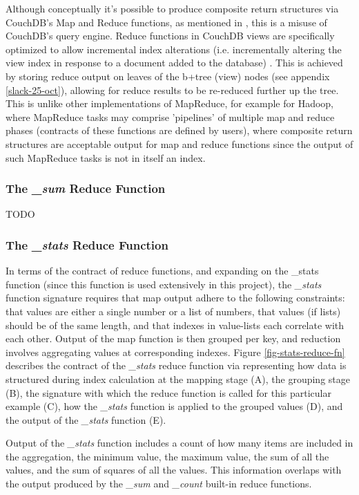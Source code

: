 Although conceptually it's possible to produce composite return structures via CouchDB's Map and Reduce functions, as mentioned in \cite{reduceFunctions}, this is a misuse of CouchDB's query engine. Reduce functions in CouchDB views are specifically optimized to allow incremental index alterations (i.e. incrementally altering the view index in response to a document added to the database) \cite{reduceFunctions}. This is achieved by storing reduce output on leaves of the b+tree (view) nodes (see appendix \ref{slack-25-oct}), allowing for reduce results to be re-reduced further up the tree. This is unlike other implementations of MapReduce, for example for Hadoop, where MapReduce tasks may comprise 'pipelines' of multiple map and reduce phases (contracts of these functions are defined by users), where composite return structures are acceptable output for map and reduce functions since the output of such MapReduce tasks is not in itself an index.

\subsubsection{The \textit{\_sum} Reduce Function}
TODO

\subsubsection{The \textit{\_stats} Reduce Function}
In terms of the contract of reduce functions, and expanding on the \_stats function (since this function is used extensively in this project), the \textit{\_stats} function signature requires that map output adhere to the following constraints: that values are either a single number or a list of numbers, that values (if lists) should be of the same length, and that indexes in value-lists each correlate with each other. Output of the map function is then grouped per key, and reduction involves aggregating values at corresponding indexes. Figure \ref{fig-stats-reduce-fn} describes the contract of the \textit{\_stats} reduce function via representing how data is structured during index calculation at the mapping stage (A), the grouping stage (B), the signature with which the reduce function is called for this particular example (C), how the \textit{\_stats} function is applied to the grouped values (D), and the output of the \textit{\_stats} function (E).

Output of the \textit{\_stats} function includes a count of how many items are included in the aggregation, the minimum value, the maximum value, the sum of all the values, and the sum of squares of all the values. This information overlaps with the output produced by the \textit{\_sum} and \textit{\_count} built-in reduce functions.

